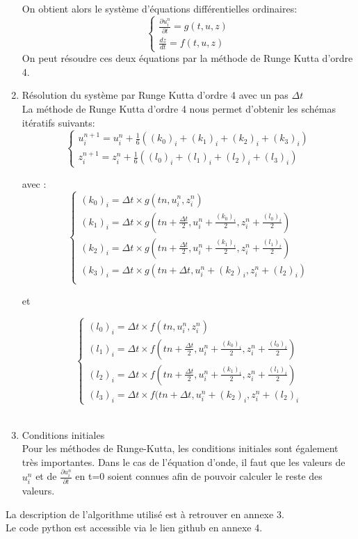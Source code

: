 \begin{enumerate}
    On obtient alors le système d'équations différentielles ordinaires:
      \[
      \begin{cases}
        \frac{\partial u^n_{i}}{\partial t}=g(t,u,z) \\
        \frac{dz}{dt}=f(t,u,z)
      \end{cases}
    \]
    On peut résoudre ces deux équations par la méthode de Runge Kutta d'ordre 4.\\
    
    \item Résolution du système par Runge Kutta d'ordre 4 avec un pas $\Delta t$\\
    
    La méthode de Runge Kutta d'ordre 4 nous permet d'obtenir les schémas itératifs suivants:
     \[
      \begin{cases}
        u^{n+1}_{i}= u^n_{i} + \frac{1}{6}((k_0)_{i} +(k_1)_{i} + (k_2)_{i} +(k_3)_{i}) \\
        z^{n+1}_{i}= z^n_{i} + \frac{1}{6}((l_0)_{i} +(l_1)_{i} + (l_2)_{i} +(l_3)_{i})
      \end{cases}
    \]
    
    avec :
    \[
      \begin{cases}
        (k_0)_{i}=\Delta t \times g(tn,u^n_{i},z^n_{i})\\
        (k_1)_{i}=\Delta t \times g(tn + \frac{\Delta t}{2},u^n_{i} +\frac{(k_0)_{i}}{2},z^n_{i} +\frac{(l_0)_{i}}{2})\\
        (k_2)_{i}=\Delta t \times g(tn + \frac{\Delta t}{2},u^n_{i} +\frac{(k_1)_{i}}{2},z^n_{i} +\frac{(l_1)_{i}}{2})\\
        (k_3)_{i}=\Delta t \times g(tn + \Delta t,u^n_{i} +(k_2)_{i},z^n_{i} +(l_2)_{i})\\
      \end{cases}
    \]
    
    et 
    
     \[
      \begin{cases}
        (l_0)_{i}=\Delta t \times f(tn,u^n_{i},z^n_{i})\\
        (l_1)_{i}=\Delta t \times f(tn + \frac{\Delta t}{2},u^n_{i} +\frac{(k_0)_{i}}{2},z^n_{i} +\frac{(l_0)_{i}}{2})\\
        (l_2)_{i}=\Delta t \times f(tn + \frac{\Delta t}{2},u^n_{i} +\frac{(k_1)_{i}}{2},z^n_{i} +\frac{(l_1)_{i}}{2})\\
        (l_3)_{i}=\Delta t \times f(tn + \Delta t,u^n_{i} +(k_2)_{i},z^n_{i} +(l_2)_{i}
      \end{cases}
    \]\\
    
    \item Conditions initiales\\
    
Pour les méthodes de Runge-Kutta, les conditions initiales sont également très importantes.
Dans le cas de l'équation d'onde, il faut que les valeurs de $u^n_{i}$ et de $\frac{\partial u^n_{i}}{\partial t}$ en t=0 soient connues afin de pouvoir calculer le reste des valeurs.\\
    
\end{enumerate}
La description de l'algorithme utilisé est à retrouver en annexe 3.\\
Le code python est accessible via le lien github en annexe 4.
